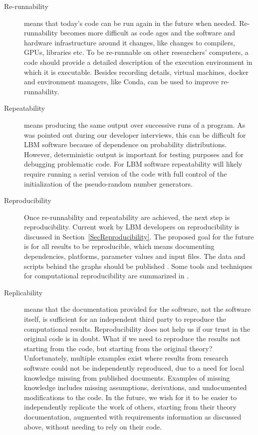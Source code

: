 \documentclass[final, 3p, times, authoryear]{elsarticle}
\begin{document}
\begin{description}

	\item[Re-runnability] means that today's code can be run again in the future
	when needed.  Re-runnability becomes more difficult as code ages and the
	software and hardware infrastructure around it changes, like changes to
	compilers, GPUs, libraries etc.  To be re-runnable on other researchers'
	computers, a code should provide a detailed description of the execution
	environment in which it is executable.  Besides recording details, virtual
	machines, docker and environment managers, like Conda, can be used to
	improve re-runnability.
	
	\item[Repeatability] means producing the same output over successive runs of
	a program.  As was pointed out during our developer interviews, this can be
	difficult for LBM software because of dependence on probability
	distributions.  However, deterministic output is important for testing
	purposes and for debugging problematic code.  For LBM software repeatability
	will likely require running a serial version of the code with full control
	of the initialization of the pseudo-random number generators.

	\item[Reproducibility] Once re-runnability and repeatability are achieved,
	the next step is reproducibility.  Current work by LBM developers on
	reproducibility is discussed in Section~\ref{SecReproducibility}.  The
	proposed goal for the future is for all results to be reproducible, which
	means documenting dependencies, platforms, parameter values and input files.
	The data and scripts behind the graphs should be published
	\citep{BenureauAndRougier2017}.  Some tools and techniques for computational
	reproducibility are summarized in \citet{PiccoloAndFrampton2016}.

	\item[Replicability] means that the documentation provided for the software,
	not the software itself, is sufficient for an independent third party to
	reproduce the computational results.  Reproducibility does not help us if
	our trust in the original code is in doubt.  What if we need to reproduce
	the results not starting from the code, but starting from the original
	theory? Unfortunately, multiple examples exist \citep{CrickAndHall2014,
	IonescuAndJansson2013} where results from research software could not be
	independently reproduced, due to a need for local knowledge missing from
	published documents.  Examples of missing knowledge includes missing
	assumptions, derivations, and undocumented modifications to the code.  In
	the future, we wish for it to be easier to independently replicate the work
	of others, starting from their theory documentation, augmented with
	requirements information as discussed above, without needing to rely on
	their code.

\end{description}
\end{document}
